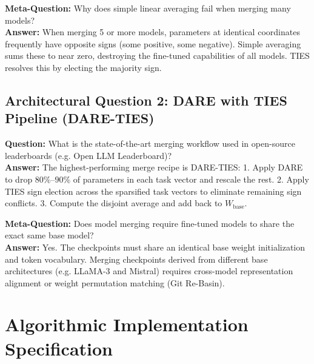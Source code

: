 \documentclass[11pt,a4paper]{article}
\theoremstyle{definition}
\begin{document}
\textbf{Meta-Question:} Why does simple linear averaging fail when merging many models?\\
\textbf{Answer:} When merging 5 or more models, parameters at identical coordinates frequently have opposite signs (some positive, some negative). Simple averaging sums these to near zero, destroying the fine-tuned capabilities of all models. TIES resolves this by electing the majority sign.

\subsection{Architectural Question 2: DARE with TIES Pipeline (DARE-TIES)}
\textbf{Question:} What is the state-of-the-art merging workflow used in open-source leaderboards (e.g. Open LLM Leaderboard)?\\
\textbf{Answer:} The highest-performing merge recipe is DARE-TIES:
1. Apply DARE to drop $80\%\text{--}90\%$ of parameters in each task vector and rescale the rest.
2. Apply TIES sign election across the sparsified task vectors to eliminate remaining sign conflicts.
3. Compute the disjoint average and add back to $W_{\text{base}}$.

\textbf{Meta-Question:} Does model merging require fine-tuned models to share the exact same base model?\\
\textbf{Answer:} Yes. The checkpoints must share an identical base weight initialization and token vocabulary. Merging checkpoints derived from different base architectures (e.g. LLaMA-3 and Mistral) requires cross-model representation alignment or weight permutation matching (Git Re-Basin).

\section{Algorithmic Implementation Specification}
\end{document}

